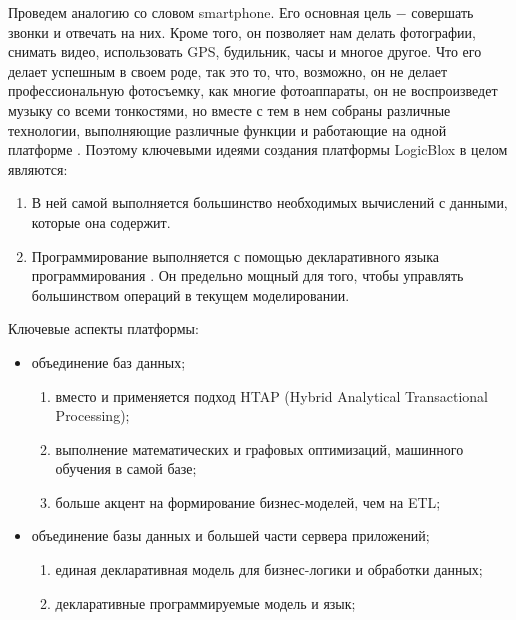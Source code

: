 Проведем аналогию со словом smartphone. Его основная цель ​− совершать звонки и отвечать на них. Кроме того, он позволяет нам делать фотографии, снимать видео, использовать GPS, будильник, часы и многое другое. Что его делает успешным в своем роде, так это то, что, возможно, он не делает профессиональную фотосъемку, как многие фотоаппараты, он не воспроизведет музыку со всеми тонкостями, но вместе с тем в нем собраны различные технологии, выполняющие различные функции и работающие на одной платформе . Поэтому ключевыми идеями создания платформы LogicBlox в целом являются:
\begin{enumerate}
  \item В ней самой выполняется большинство необходимых вычислений с данными, которые она содержит.
  \item Программирование выполняется с помощью декларативного языка программирования \logiql. Он предельно мощный для того, чтобы управлять большинством операций в текущем моделировании.
\end{enumerate}

Ключевые аспекты платформы:
\begin{itemize}
  \item объединение баз данных;
    \begin{enumerate}[leftmargin=5.5mm]
      \item вместо \olap и \oltp применяется подход HTAP (Hybrid Analytical Transactional Processing);
      \item выполнение математических и графовых оптимизаций, машинного обучения в самой базе;
      \item больше акцент на формирование бизнес-моделей, чем на ETL;
    \end{enumerate}
  \item объединение базы данных и большей части сервера приложений;
  \begin{enumerate}[leftmargin=5.5mm]
    \item единая декларативная модель для бизнес-логики и обработки данных;
    \item декларативные программируемые модель и язык;
  \end{enumerate}
\end{itemize}

